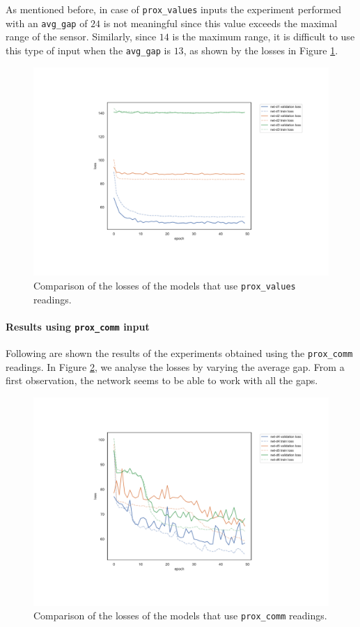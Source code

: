 As mentioned before, in case of \texttt{prox\_values} inputs the 
experiment performed with an \texttt{avg\_gap} of $24$ is not meaningful since 
this value exceeds the maximal range of the sensor. Similarly, since $14$ is the 
maximum range, it is difficult to use this type of input when the \texttt{avg\_gap}  
is $13$, as shown by the losses in Figure \ref{fig:distlossprox_values}.
\begin{figure}[!htb]
	\centering
	\includegraphics[width=.85\textwidth]{contents/images/task1/loss-distributed-prox_values@}%
	\caption{Comparison of the losses of the models that use \texttt{prox\_values} 
		readings.}
	\label{fig:distlossprox_values}
\end{figure}

\paragraph*{Results using \texttt{prox\_comm} input}
Following are shown the results of the experiments obtained using the 
\texttt{prox\_comm} readings. 
In Figure \ref{fig:distlossprox_comm}, we analyse the losses by varying the 
average gap. From a first observation, the network seems to be able to work with 
all the gaps.
\begin{figure}[!htb]
	\centering
	\includegraphics[width=.85\textwidth]{contents/images/task1/loss-distributed-prox_comm@}%
	\caption{Comparison of the losses of the models that use \texttt{prox\_comm} 
		readings.}
	\label{fig:distlossprox_comm}
\end{figure}

